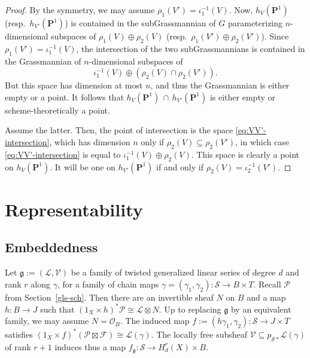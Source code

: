 \documentclass[a4paper,11pt]{amsart}
\theoremstyle{plain}
\theoremstyle{definition}
\theoremstyle{remark}
\def\L{\mathcal{L}}
\def\V{\mathcal{V}}
\def\IP{{\mathbf P}}
\begin{document}
\begin{proof} By the symmetry, we may assume $\rho_1(V')=\iota^{-1}_1(V)$. Now, 
$h_V(\IP^1)$ (resp.~$h_{V'}(\IP^1)$) is contained in the subGrassmannian of $G$ parameterizing $n$-dimensional subspaces of $\rho_1(V)\oplus\rho_2(V)$ (resp.~$\rho_1(V')\oplus\rho_2(V')$).
Since $\rho_1(V')=\iota^{-1}_1(V)$, the intersection of the two subGrassmannians is contained in the Grassmannian of $n$-dimensional subspaces of 
\begin{equation}\label{eq:VV'-intersection}
\iota^{-1}_1(V)\oplus(\rho_2(V)\cap\rho_2(V')).
\end{equation}
But this space has dimension at most $n$, and thus the Grassmannian is either empty or a point. It follows that $h_{V}(\IP^1)\,\cap\,h_{V'}(\IP^1)$ is either empty or scheme-theoretically a point. 

Assume the latter. Then, the point of intersection is the space \eqref{eq:VV'-intersection}, which has dimension $n$ only if $\rho_2(V)\subseteq\rho_2(V')$, in which case \eqref{eq:VV'-intersection} is equal to $\iota^{-1}_1(V)\oplus\rho_2(V)$. This space is clearly a point on $h_V(\IP^1)$. It will be one on $h_{V'}(\IP^1)$ if and only if $\rho_2(V)=\iota_2^{-1}(V')$. \end{proof}

\section{Representability}

\subsection{Embeddedness}

Let $\mathfrak g:=(\L,\V)$ be a family of twisted generalized linear series of degree $d$ and rank $r$ 
along $\gamma$, for a family of chain maps $\gamma=(\gamma_1,\gamma_2)\colon\mathcal S\to B\times T$. Recall $\mathcal P$ from Section~\ref{gls-sch}. Then 
there are an invertible sheaf $N$ on $B$ and a map $h\colon B\to J$ 
such that $(1_X\times h)^*\mathcal P\cong \L\otimes N$. Up to replacing $\mathfrak g$ by an equivalent family, we may assume $N=\mathcal O_B$. 
The induced map $f:=(h\gamma_1,\gamma_2)\colon\mathcal S\to J\times T$ satisfies 
$(1_X\times f)^*(\mathcal P\boxtimes\mathcal F)\cong\L(\gamma)$. The locally free subsheaf $\V\subseteq p_{\mathcal S*}\mathcal L(\gamma)$ 
of rank $r+1$ induces thus a map 
$f_{\mathfrak g}\colon\mathcal S\to H^r_d(X)\times B$.
\end{document}
